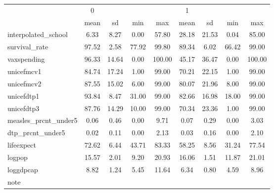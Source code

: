 \begin{tabular}{l*{2}{cccc}}
\toprule
            &           0&            &            &            &           1&            &            &            \\
            &        mean&          sd&         min&         max&        mean&          sd&         min&         max\\
\midrule
interpolated\_school&        6.33&        8.27&        0.00&       57.80&       28.18&       21.53&        0.04&       85.00\\
survival\_rate&       97.52&        2.58&       77.92&       99.80&       89.34&        6.02&       66.42&       99.00\\
vaxspending &       96.33&       14.64&        0.00&      100.00&       45.17&       36.47&        0.00&      100.00\\
unicefmcv1  &       84.74&       17.24&        1.00&       99.00&       70.21&       22.15&        1.00&       99.00\\
unicefmcv2  &       87.55&       15.02&        6.00&       99.00&       80.07&       21.96&        8.00&       99.00\\
unicefdtp1  &       93.84&        8.47&       31.00&       99.00&       82.66&       16.98&       18.00&       99.00\\
unicefdtp3  &       87.76&       14.29&       10.00&       99.00&       70.34&       23.36&        1.00&       99.00\\
measles\_prcnt\_under5&        0.06&        0.46&        0.00&        9.71&        0.07&        0.29&        0.00&        3.03\\
dtp\_prcnt\_under5&        0.02&        0.11&        0.00&        2.13&        0.03&        0.16&        0.00&        2.10\\
lifeexpect  &       72.62&        6.44&       43.71&       83.33&       58.25&        8.56&       31.24&       77.54\\
logpop      &       15.57&        2.01&        9.20&       20.93&       16.06&        1.51&       11.87&       21.01\\
loggdpcap   &        8.82&        1.24&        5.45&       11.64&        6.34&        0.80&        4.59&        8.96\\
\bottomrule
\multicolumn{9}{l}{\footnotesize note}\\
\end{tabular}
